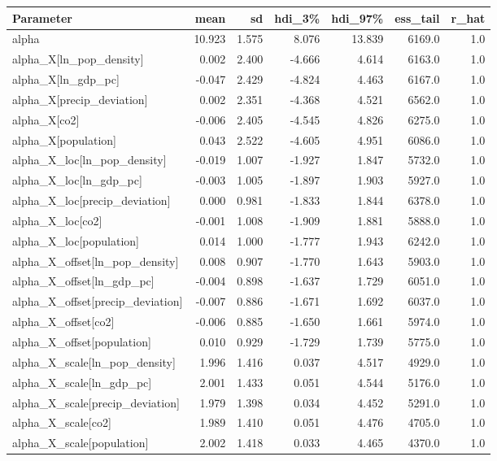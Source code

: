 \begin{table}[htbp]
\centering
{}
\label{tab:event_frequency_results_1}
\footnotesize
\begin{tabular}{lrrrrrr}
\toprule
\textbf{Parameter} & \textbf{mean} & \textbf{sd} & \textbf{hdi\_3\%} & \textbf{hdi\_97\%} & \textbf{ess\_tail} & \textbf{r\_hat} \\
\midrule
alpha & 10.923 & 1.575 & 8.076 & 13.839 & 6169.0 & 1.0 \\
alpha\_X[ln\_pop\_density] & 0.002 & 2.400 & -4.666 & 4.614 & 6163.0 & 1.0 \\
alpha\_X[ln\_gdp\_pc] & -0.047 & 2.429 & -4.824 & 4.463 & 6167.0 & 1.0 \\
alpha\_X[precip\_deviation] & 0.002 & 2.351 & -4.368 & 4.521 & 6562.0 & 1.0 \\
alpha\_X[co2] & -0.006 & 2.405 & -4.545 & 4.826 & 6275.0 & 1.0 \\
alpha\_X[population] & 0.043 & 2.522 & -4.605 & 4.951 & 6086.0 & 1.0 \\
alpha\_X\_loc[ln\_pop\_density] & -0.019 & 1.007 & -1.927 & 1.847 & 5732.0 & 1.0 \\
alpha\_X\_loc[ln\_gdp\_pc] & -0.003 & 1.005 & -1.897 & 1.903 & 5927.0 & 1.0 \\
alpha\_X\_loc[precip\_deviation] & 0.000 & 0.981 & -1.833 & 1.844 & 6378.0 & 1.0 \\
alpha\_X\_loc[co2] & -0.001 & 1.008 & -1.909 & 1.881 & 5888.0 & 1.0 \\
alpha\_X\_loc[population] & 0.014 & 1.000 & -1.777 & 1.943 & 6242.0 & 1.0 \\
alpha\_X\_offset[ln\_pop\_density] & 0.008 & 0.907 & -1.770 & 1.643 & 5903.0 & 1.0 \\
alpha\_X\_offset[ln\_gdp\_pc] & -0.004 & 0.898 & -1.637 & 1.729 & 6051.0 & 1.0 \\
alpha\_X\_offset[precip\_deviation] & -0.007 & 0.886 & -1.671 & 1.692 & 6037.0 & 1.0 \\
alpha\_X\_offset[co2] & -0.006 & 0.885 & -1.650 & 1.661 & 5974.0 & 1.0 \\
alpha\_X\_offset[population] & 0.010 & 0.929 & -1.729 & 1.739 & 5775.0 & 1.0 \\
alpha\_X\_scale[ln\_pop\_density] & 1.996 & 1.416 & 0.037 & 4.517 & 4929.0 & 1.0 \\
alpha\_X\_scale[ln\_gdp\_pc] & 2.001 & 1.433 & 0.051 & 4.544 & 5176.0 & 1.0 \\
alpha\_X\_scale[precip\_deviation] & 1.979 & 1.398 & 0.034 & 4.452 & 5291.0 & 1.0 \\
alpha\_X\_scale[co2] & 1.989 & 1.410 & 0.051 & 4.476 & 4705.0 & 1.0 \\
alpha\_X\_scale[population] & 2.002 & 1.418 & 0.033 & 4.465 & 4370.0 & 1.0 \\
\bottomrule
\end{tabular}
\end{table}
